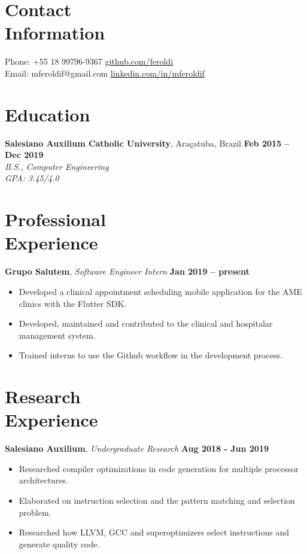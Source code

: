 \documentclass[margin,line]{resume}
\begin{document}
\begin{resume}
    \section{\mysidestyle Contact\\Information}

    Phone: +55 18 99796-9367 \hfill \url{github.com/feroldi}\\
    \noindent Email: mferoldif@gmail.com \hfill \url{linkedin.com/in/mferoldif}

    \section{\mysidestyle Education}

    \textbf{Salesiano Auxilium Catholic University}, Araçatuba, Brazil \hfill \textbf{Feb 2015 -- Dec 2019}\\
    \textsl{B.S., Computer Engineering}\\
    \textsl{GPA: 3.45/4.0}

    \section{\mysidestyle Professional\\Experience}

    \textbf{Grupo Salutem}, \textit{Software Engineer Intern} \hfill \textbf{Jan 2019 -- present}
    \begin{itemize}
        \item Developed a clinical appointment scheduling mobile application for the AME clinics with the Flutter SDK.
        \item Developed, maintained and contributed to the clinical and hospitalar management system.
        \item Trained interns to use the Github workflow in the development process.
    \end{itemize}

    \section{\mysidestyle Research\\Experience}

    \textbf{Salesiano Auxilium}, \textsl{Undergraduate Research} \hfill \textbf{Aug 2018 - Jun 2019}
    \begin{itemize}
        \item Researched compiler optimizations in code generation for multiple processor architectures.
        \item Elaborated on instruction selection and the pattern matching and selection problem.
        \item Researched how LLVM, GCC and superoptimizers select instructions and generate quality code.
    \end{itemize}


\end{resume}
\end{document}

